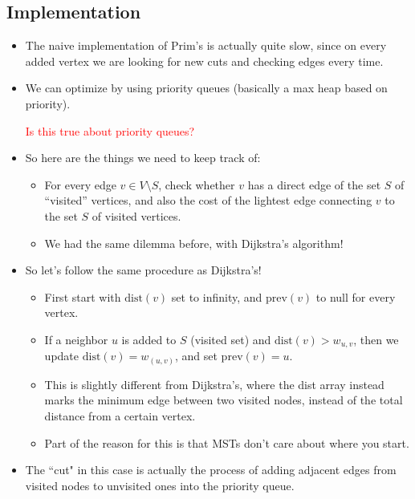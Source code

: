 \documentclass[10pt]{article}
\newcommand{\prev}{\mathrm{prev}}
\newcommand{\dist}{\mathrm{dist}}
\newcommand{\question}[1]{\textcolor{red}{#1}}
\begin{document}
	\subsection{Implementation}
	\begin{itemize}
		\item The naive implementation of Prim's is actually quite slow, since on every added vertex we 
			are looking for new cuts and checking edges every time.
		\item We can optimize by using priority queues (basically a max heap based on priority).  

			\question{Is this true about priority queues?}
		\item So here are the things we need to keep track of:
			\begin{itemize}
				\item For every edge $v \in V \setminus S$, check whether $v$ has a direct 
					edge of the set $S$ of ``visited'' vertices, and also the cost of the lightest 
					edge connecting
					$v$ to the set $S$ of visited vertices.
				\item We had the same dilemma before, with Dijkstra's algorithm!
			\end{itemize}
		\item So let's follow the same procedure as Dijkstra's!
			\begin{itemize}
				\item First start with $\dist(v)$ set to infinity, and $\prev(v)$ to null for 
					every vertex.
				\item If a neighbor $u$ is added to $S$ (visited set) and $\dist(v) > w_{u, v}$, then 
					we update $\dist(v) = w_{(u, v)}$, and set $\prev(v) = u$. 
				\item This is slightly different from Dijkstra's, where the dist array instead marks 
					the minimum edge between two visited nodes, instead of the total distance 
					from a certain vertex. 
				\item Part of the reason for this is that MSTs don't care about where you start. 
			\end{itemize}
		\item The ``cut" in this case is actually the process of adding adjacent edges from visited nodes
			to unvisited ones into the priority queue. 
	\end{itemize}
\end{document}
